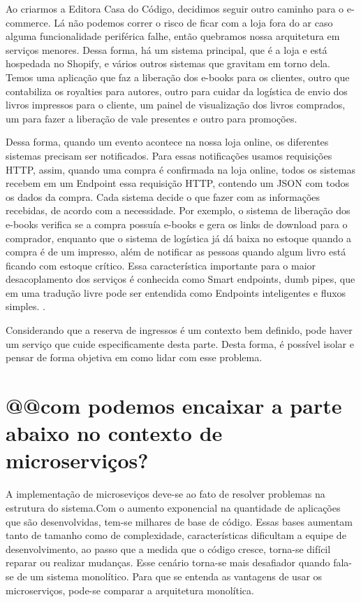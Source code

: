 \begin{citacao}

Ao criarmos a Editora Casa do Código, decidimos seguir outro caminho para o e-commerce.
Lá não podemos correr o risco de ficar com a loja fora do ar caso alguma funcionalidade
periférica falhe, então quebramos nossa arquitetura em serviços menores. Dessa forma, há
um sistema principal, que é a loja e está hospedada no Shopify, e vários outros sistemas
que gravitam em torno dela. Temos uma aplicação que faz a liberação dos e-books para os
clientes, outro que contabiliza os royalties para autores, outro para cuidar da logística
de envio dos livros impressos para o cliente, um painel de visualização dos livros comprados,
um para fazer a liberação de vale presentes e outro para promoções.

Dessa forma, quando um evento acontece na nossa loja online, os diferentes sistemas precisam
ser notificados. Para essas notificações usamos requisições HTTP, assim, quando uma compra
é confirmada na loja online, todos os sistemas recebem em um Endpoint essa requisição HTTP,
contendo um JSON com todos os dados da compra. Cada sistema decide o que fazer com as informações
recebidas, de acordo com a necessidade. Por exemplo, o sistema de liberação dos e-books verifica
se a compra possuía e-books e gera os links de download para o comprador, enquanto que o sistema
de logística já dá baixa no estoque quando a compra é de um impresso, além de notificar as pessoas
quando algum livro está ficando com estoque crítico. Essa característica importante para o maior
desacoplamento dos serviços é conhecida como Smart endpoints, dumb pipes, que em uma tradução
livre pode ser entendida como Endpoints inteligentes e fluxos
simples. \cite{arquitetura-de-microservicos-ou-monolitica}.

\end{citacao}


Considerando que a reserva de ingressos é um contexto bem definido, pode haver um serviço que cuide
especificamente desta parte. Desta forma, é possível isolar e pensar de forma objetiva em como
lidar com esse problema.



\section{@@com podemos encaixar a parte abaixo no contexto de microserviços?}

A implementação de microseviços deve-se ao fato de resolver problemas na estrutura do sistema.Com o aumento exponencial
na quantidade de aplicações que são desenvolvidas, tem-se milhares de base de código. Essas bases
aumentam tanto de tamanho como de complexidade, características dificultam a equipe de desenvolvimento, ao passo que a 
medida que o código cresce, torna-se difícil reparar ou realizar mudanças. Esse cenário torna-se mais desafiador quando 
fala-se de um sistema monolítico. Para que se entenda as vantagens de usar os microserviços, pode-se comparar a arquitetura
monolítica.


